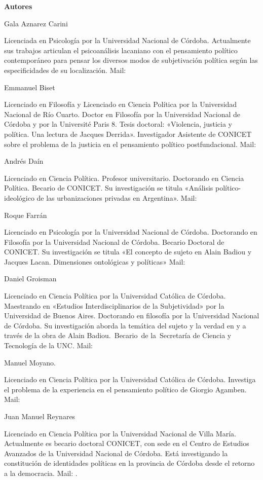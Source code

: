 \textbf{Autores}

Gala Aznarez Carini

Licenciada en Psicología por la Universidad Nacional de Córdoba. Actualmente sus trabajos articulan el psicoanálisis lacaniano con el pensamiento político contemporáneo para pensar los diversos modos de subjetivación política según las especificidades de su localización. Mail:

Emmanuel Biset

Licenciado en Filosofía y Licenciado en Ciencia Política por la Universidad Nacional de Río Cuarto. Doctor en Filosofía por la Universidad Nacional de Córdoba y por la Université Paris 8. Tesis doctoral: «Violencia, justicia y política. Una lectura de Jacques Derrida». Investigador Asistente de CONICET sobre el problema de la justicia en el pensamiento político postfundacional. Mail:

Andrés Daín

Licenciado en Ciencia Política. Profesor universitario. Doctorando en Ciencia Política. Becario de CONICET. Su investigación se titula «Análisis político-ideológico de las urbanizaciones privadas en Argentina». Mail:

Roque Farrán

Licenciado en Psicología por la Universidad Nacional de Córdoba. Doctorando en Filosofía por la Universidad Nacional de Córdoba. Becario Doctoral de CONICET. Su investigación se titula «El concepto de sujeto en Alain Badiou y Jacques Lacan. Dimensiones ontológicas y políticas» Mail:

Daniel Groisman

Licenciado en Ciencia Política por la Universidad Católica de Córdoba. Maestrando en «Estudios Interdisciplinarios de la Subjetividad» por la Universidad de Buenos Aires. Doctorando en filosofía por la Universidad Nacional de Córdoba. Su investigación aborda la temática del sujeto y la verdad en y a través de la obra de Alain Badiou.~Becario~de la~Secretaría de Ciencia y Tecnología de la UNC. Mail:~

Manuel Moyano.

Licenciado en Ciencia Política por la Universidad Católica de Córdoba. Investiga el problema de la experiencia en el pensamiento político de Giorgio Agamben. Mail:~~

Juan Manuel Reynares

Licenciado en Ciencia Política por la Universidad Nacional de Villa María. Actualmente es becario doctoral CONICET, con sede en el Centro de Estudios Avanzados de la Universidad Nacional de Córdoba. Está investigando la constitución de identidades políticas en la provincia de Córdoba desde el retorno a la democracia. Mail: .

